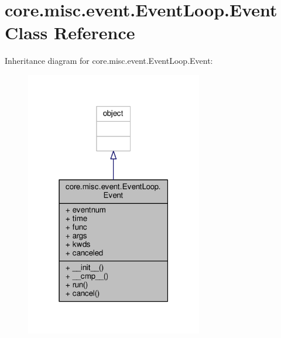 \hypertarget{classcore_1_1misc_1_1event_1_1_event_loop_1_1_event}{\section{core.\+misc.\+event.\+Event\+Loop.\+Event Class Reference}
\label{classcore_1_1misc_1_1event_1_1_event_loop_1_1_event}
}


Inheritance diagram for core.\+misc.\+event.\+Event\+Loop.\+Event\+:
\nopagebreak
\begin{figure}[H]
\begin{center}
\leavevmode
\includegraphics[width=219pt]{classcore_1_1misc_1_1event_1_1_event_loop_1_1_event__inherit__graph}
\end{center}
\end{figure}


